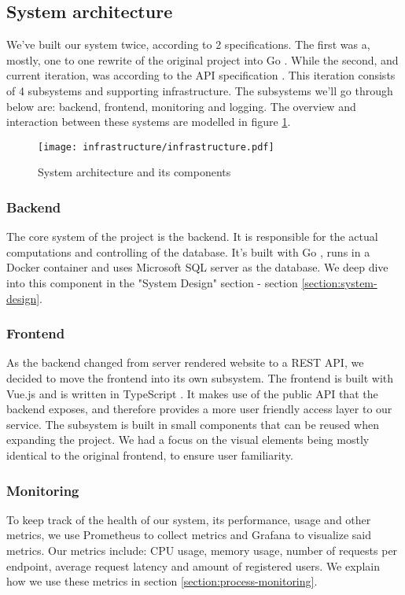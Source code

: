 \subsection{System architecture}
We've built our system twice, according to 2 specifications. The first was a, mostly, one to one rewrite of the original project into Go \cite{tool:go}.
While the second, and current iteration, was according to the API specification \cite{spec:api}. 
This iteration consists of 4 subsystems and supporting infrastructure. The subsystems we'll go through below are: backend, frontend, monitoring and logging.
The overview and interaction between these systems are modelled in figure \ref{fig:architecture}.
\begin{figure}[H]
    \centering
    \texttt{[image: infrastructure/infrastructure.pdf]}
    \caption{System architecture and its components}
    \label{fig:architecture}
\end{figure}

\subsubsection{Backend}
The core system of the project is the backend. It is responsible for the actual computations and controlling of the database.
It's built with Go \cite{tool:go}, runs in a Docker container and uses Microsoft SQL server \cite{tool:microsoft-sql-server} as the database. We deep dive into this component in the "System Design" section - section \ref{section:system-design}.

\subsubsection{Frontend}
As the backend changed from server rendered website to a REST API, we decided to move the frontend into its own subsystem.
The frontend is built with Vue.js \cite{tool:vue} and is written in TypeScript \cite{tool:typescript}.
It makes use of the public API that the backend exposes, and therefore provides a more user friendly access layer to our service.
The subsystem is built in small components that can be reused when expanding the project. We had a focus on the visual elements being mostly identical to the original frontend, to ensure user familiarity.

\subsubsection{Monitoring}
To keep track of the health of our system, its performance, usage and other metrics, we use Prometheus \cite{tool:prometheus} to collect metrics and Grafana \cite{tool:grafana} to visualize said metrics.
Our metrics include: CPU usage, memory usage, number of requests per endpoint, average request latency and amount of registered users.
We explain how we use these metrics in section \ref{section:process-monitoring}.


